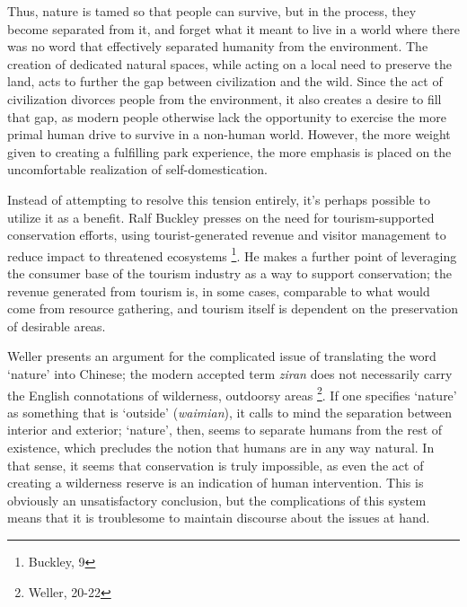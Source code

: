 Thus, nature is tamed so that people can survive, but in the process, they
become separated from it, and forget what it meant to live in a world where
there was no word that effectively separated humanity from the environment.  The
creation of dedicated natural spaces, while acting on a local need to preserve
the land, acts to further the gap between civilization and the wild.  Since the
act of civilization divorces people from the environment, it also creates a
desire to fill that gap, as modern people otherwise lack the opportunity to
exercise the more primal human drive to survive in a non-human world. However,
the more weight given to creating a fulfilling park experience, the more
emphasis is placed on the uncomfortable realization of self-domestication.

Instead of attempting to resolve this tension entirely, it's perhaps possible to
utilize it as a benefit. Ralf Buckley presses on the need for tourism-supported
conservation efforts, using tourist-generated revenue and visitor management to
reduce impact to threatened ecosystems \footnote{Buckley, 9}. He makes a further
point of leveraging the consumer base of the tourism industry as a way to
support conservation; the revenue generated from tourism is, in some cases,
comparable to what would come from resource gathering, and tourism itself is
dependent on the preservation of desirable areas.

Weller presents an argument for the complicated issue of translating the word
`nature' into Chinese; the modern accepted term \textit{ziran} does not
necessarily carry the English connotations of wilderness, outdoorsy areas
\footnote{Weller, 20-22}. If one specifies `nature' as something that is
`outside' (\textit{waimian}), it calls to mind the separation between interior
and exterior; `nature', then, seems to separate humans from the rest of
existence, which precludes the notion that humans are in any way natural. In
that sense, it seems that conservation is truly impossible, as even the act of
creating a wilderness reserve is an indication of human intervention. This is
obviously an unsatisfactory conclusion, but the complications of this system
means that it is troublesome to maintain discourse about the issues at hand.
